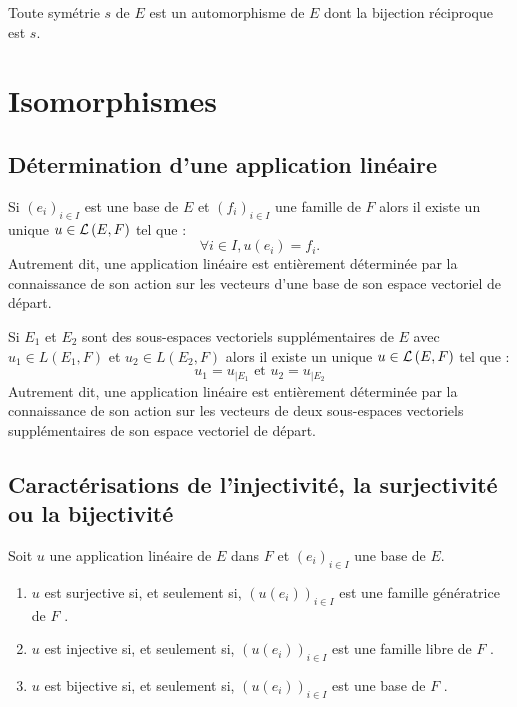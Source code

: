 \begin{defprop}
    Toute symétrie \(s\) de \(E\) est un automorphisme de \(E\) dont la bijection réciproque est \(s\).
\end{defprop}

\section{Isomorphismes}
\subsection{Détermination d’une application linéaire}
\begin{defprop}
    Si \((e_i)_{i\in I}\) est une base de \(E\) et \((f_i)_{i\in I}\) une famille de \(F\) alors il existe un unique \(u \in  \mathcal{L}\left(E,F\right)\) tel que :
    \[\forall i \in  I, u(e_i) = f_i.\]
    Autrement dit, une application linéaire est entièrement déterminée par la connaissance de son action sur les vecteurs d’une base de son espace vectoriel de départ.
\end{defprop}

\begin{defprop}[Recollement]
    Si \(E_1\) et \(E_2\) sont des sous-espaces vectoriels supplémentaires de \(E\) avec \(u_1 \in  L(E_1, F )\) et \(u_2 \in  L(E_2, F )\) alors il existe un unique \(u \in  \mathcal{L}\left(E,F\right)\) tel que :
    \[u_1 = u_{|E_1} \text{ et }u_2 = u_{|E_2} \]
Autrement dit, une application linéaire est entièrement déterminée par la connaissance de son action sur les vecteurs de deux sous-espaces vectoriels supplémentaires de son espace vectoriel de départ.
\end{defprop}

\subsection{Caractérisations de l’injectivité, la surjectivité ou la bijectivité}
\begin{defprop}
    Soit \(u\) une application linéaire de \(E\) dans \(F\) et \((e_i)_{i\in I}\) une base de \(E\).
    \begin{enumerate}
        \item \(u\) est surjective si, et seulement si, \((u(e_i))_{i\in I}\) est une famille génératrice de \(F\) .
        \item \(u\) est injective si, et seulement si, \((u(e_i))_{i\in I}\) est une famille libre de \(F\) .
        \item \(u\) est bijective si, et seulement si, \((u(e_i))_{i\in I}\) est une base de \(F\) .
    \end{enumerate}
\end{defprop}


